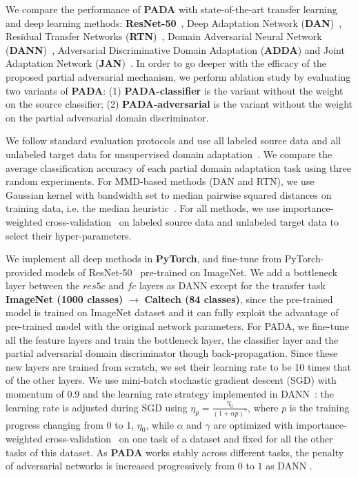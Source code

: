 \documentclass[runningheads]{llncs}
\begin{document}
We compare the performance of \textbf{PADA} with state-of-the-art transfer learning and deep learning methods: \textbf{ResNet-50}~\cite{cite:CVPR16DRL}, Deep Adaptation Network (\textbf{DAN})~\cite{cite:ICML15DAN}, Residual Transfer Networks (\textbf{RTN})~\cite{cite:NIPS16RTN}, Domain Adversarial Neural Network (\textbf{DANN})~\cite{cite:ICML15RevGrad}, Adversarial Discriminative Domain Adaptation (\textbf{ADDA}) \cite{cite:CVPR17ADDA} and Joint Adaptation Network (\textbf{JAN})~\cite{cite:ICML17JAN}. In order to go deeper with the efficacy of the proposed partial adversarial mechanism, we perform ablation study by evaluating two variants of \textbf{PADA}: (1) \textbf{PADA-classifier} is the variant without the weight on the source classifier; (2) \textbf{PADA-adversarial} is the variant without the weight on the partial adversarial domain discriminator.

We follow standard evaluation protocols and use all labeled source data and all unlabeled target data for unsupervised domain adaptation~\cite{cite:ECCV10Office,cite:ICML15DAN}. We compare the average classification accuracy of each partial domain adaptation task using three random experiments. For MMD-based methods (DAN and RTN), we use Gaussian kernel with bandwidth set to median pairwise squared distances on training data, i.e. the median heuristic~\cite{cite:NIPS12MKMMD}. For all methods, we use importance-weighted cross-validation~\cite{cite:JMLR07IWCV} on labeled source data and unlabeled target data to select their hyper-parameters.

We implement all deep methods in \textbf{PyTorch}, and fine-tune from PyTorch-provided models of ResNet-50~\cite{cite:NIPS12CNN} pre-trained on ImageNet. We add a bottleneck layer between the $res5c$ and $fc$ layers as DANN \cite{cite:ICML15RevGrad} except for the transfer task \textbf{ImageNet (1000 classes)} $\rightarrow$ \textbf{Caltech (84 classes)}, since the pre-trained model is trained on ImageNet dataset and it can fully exploit the advantage of pre-trained model with the original network parameters. For PADA, we fine-tune all the feature layers and train the bottleneck layer, the classifier layer and the partial adversarial domain discriminator though back-propagation. Since these new layers are trained from scratch, we set their learning rate to be 10 times that of the other layers. We use mini-batch stochastic gradient descent (SGD) with momentum of 0.9 and the learning rate strategy implemented in DANN~\cite{cite:ICML15RevGrad}: the learning rate is adjusted during SGD using $\eta_p = \frac{\eta_0}{{(1+\alpha p)}^\gamma}$, where $p$ is the training progress changing from 0 to 1,  $\eta_0$, while $\alpha$ and $\gamma$ are optimized with importance-weighted cross-validation~\cite{cite:JMLR07IWCV} on one task of a dataset and fixed for all the other tasks of this dataset. As \textbf{PADA} works stably across different tasks, the penalty of adversarial networks is increased progressively from $0$ to $1$ as DANN \cite{cite:ICML15RevGrad}. 
\end{document}
